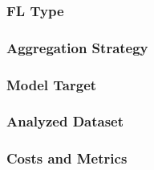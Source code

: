 \subsubsection{FL Type\label{sec:sota.quali.type}}

\subsubsection{Aggregation Strategy\label{sec:sota.quali.agg}}

\subsubsection{Model Target\label{sec:sota.quali.target}}

\subsubsection{Analyzed Dataset\label{sec:sota.quali.dataset}}

\subsubsection{Costs and Metrics\label{sec:sota.quali.metrics}}
